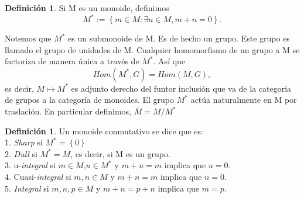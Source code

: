 \documentclass[12pt,spanish]{amsart}
\newcommand{\set}[1]{\left\{{#1}\right\}}
\theoremstyle{definition}
\newtheorem{Def}[Theorem]{Definición}
\theoremstyle{remark}
\begin{document}
\begin{Def}
Si M es un monoide, definimos $$M^{\ast}:=\set{m\in M:\exists n\in M,m+n=0}.$$
\end{Def}

Notemos que $M^{\ast}$ es un submonoide de M. Es de hecho un grupo. Este grupo es llamado el grupo de unidades de M. Cualquier homomorfismo de un grupo a M se factoriza de manera única a través de $M^{\ast}$. Así que 
$$Hom(M^{\ast},G)=Hom(M,G),$$
es decir, $M\mapsto M^{\ast}$ es adjunto derecho del funtor inclusión que va de la categoría de grupos a la categoría de monoides. El grupo $M^{\ast}$ actúa naturalmente en M por traslación. En particular definimos, $\overline{M}= M/M^{\ast}$

\begin{Def}
Un monoide conmutativo se dice que es: \\
1. \textit{Sharp} si $M^{\ast}=\set{0}$ \\
2. \textit{Dull} si $M^{\ast}=M$, es decir, si M es un grupo. \\
3. u-\textit{integral} si $m\in M$,$u\in M^{\ast}$ y $m+u=m$ implica que $u=0$.\\
4. Cuasi-\textit{integral} si $m,n\in M$ y $m+n=m$ implica que $n=0$. \\
5. \textit{Integral} si $m,n,p\in M$ y $m+n=p+n$ implica que $m=p$.
\end{Def}
\end{document}
